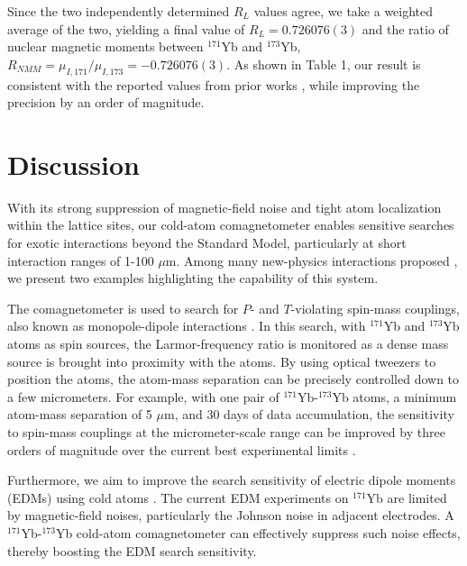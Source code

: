 \documentclass[pdflatex,sn-nature,centre]{sn-jnl}%
\begin{document}
Since the two independently determined $R_L$ values agree, we take a weighted average of the two, yielding a final value of $R_L = 0.726076(3)$ and the ratio of nuclear magnetic moments between $^{171}$Yb and $^{173}$Yb, $R_{NMM} = \mu_{I,171}/\mu_{I,173} = -0.726076(3)$. As shown in Table 1, our result is consistent with the reported values from prior works \cite{Gossard1964RefNMR, Olschewski1972Ref, Stone2005Ref}, while improving the precision by an order of magnitude.


\section*{Discussion}

With its strong suppression of magnetic-field noise and tight atom localization within the lattice sites, our cold-atom comagnetometer enables sensitive searches for exotic interactions beyond the Standard Model, particularly at short interaction ranges of 1-100 $\mu$m. Among many new-physics interactions proposed \cite{Safronova2018NewPhys, Lei2025SpinExoticRMP}, we present two examples highlighting the capability of this system.

The comagnetometer is used to search for $\mathit P$- and $\mathit T$-violating spin-mass couplings, also known as monopole-dipole interactions \cite{Moody1984M-N, Bulatowicz2013ComagAxionlike, Tullney2013SpinDependent, Feng2022XeComagM-N}. In this search, with $^{171}$Yb and $^{173}$Yb atoms as spin sources, the Larmor-frequency ratio is monitored as a dense mass source is brought into proximity with the atoms. By using optical tweezers to position the atoms, the atom-mass separation can be precisely controlled down to a few micrometers. For example, with one pair of $^{171}$Yb-$^{173}$Yb atoms, a minimum atom-mass separation of 5 $\mu$m, and 30 days of data accumulation, the sensitivity to spin-mass couplings at the micrometer-scale range can be improved by three orders of magnitude over the current best experimental limits \cite{Guigue2015Spin3HePRD}.

Furthermore, we aim to improve the search sensitivity of electric dipole moments (EDMs) using cold atoms \cite{Bishof2016RaEDM, Zheng2022YbEDM}. The current EDM experiments on $^{171}$Yb \cite{Zheng2022YbEDM} are limited by magnetic-field noises, particularly the Johnson noise in adjacent electrodes. A $^{171}$Yb-$^{173}$Yb cold-atom comagnetometer can effectively suppress such noise effects, thereby boosting the EDM search sensitivity.
\end{document}
